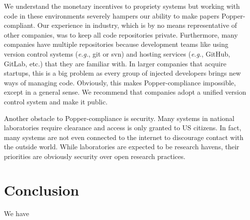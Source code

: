 We understand the monetary incentives to propriety systems but working with
code in these environments severely hampers our ability to make papers
Popper-compliant. Our experience in industry, which is by no means
representative of other companies, was to keep all code repositories private.
Furthermore, many companies have multiple repositories because development
teams like using version control systems ({\it e.g.}, git or svn) and hosting
services ({\it e.g.}, GitHub, GitLab, etc.) that they are familiar with. In
larger companies that acquire startups, this is a big problem as every group of
injected developers brings new ways of managing code.  Obviously, this makes
Popper-compliance impossible, except in a general sense.  We recommend that
companies adopt a unified version control system and make it public.

Another obstacle to Popper-compliance is security. Many systems in national
laboratories require clearance and access is only granted to US citizens. In
fact, many systems are not even connected to the internet to discourage contact
with the outside world. While laboratories are expected to be research havens,
their priorities are obviously security over open research practices.

\section{Conclusion}

We have 
